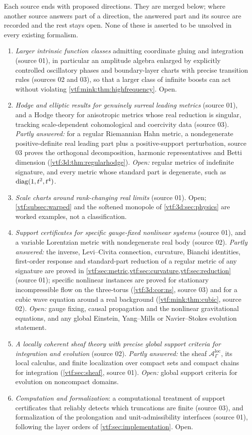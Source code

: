 \documentclass[11pt,letterpaper]{article}
\theoremstyle{definition}
\theoremstyle{remark}
\newcommand{\A}{\mathscr A}\newcommand{\OO}{\mathcal O}\newcommand{\mm}{\mathfrak m}
\begin{document}
Each source ends with proposed directions. They are merged below; where another
source answers part of a direction, the answered part and its source are
recorded and the rest stays open. None of these is asserted to be unsolved in
every existing formalism.
\begin{enumerate}
\item \emph{Larger intrinsic function classes} admitting coordinate gluing and
integration (source 01), in particular an amplitude algebra enlarged by
explicitly controlled oscillatory phases and boundary-layer charts with precise
transition rules (sources 02 and 03), so that a larger class of infinite boosts
can act without violating \cref{vtf:mink:thm:highfrequency}. Open.
\item \emph{Hodge and elliptic results for genuinely surreal leading metrics}
(source 01), and a Hodge theory for anisotropic metrics whose real reduction is
singular, tracking scale-dependent cohomological and coercivity data (source 03).
\emph{Partly answered:} for a regular Riemannian Hahn metric, a nondegenerate
positive-definite real leading part plus a positive-support perturbation, source
03 proves the orthogonal decomposition, harmonic representatives and Betti
dimension (\cref{vtf:3d:thm:regularhodge}). \emph{Open:} regular metrics of
indefinite signature, and every metric whose standard part is degenerate, such as
$\operatorname{diag}(1,t^2,t^4)$.
\item \emph{Scale charts around rank-changing real limits} (source 01). Open;
\cref{vtf:subsec:warped} and the softened monopole of \cref{vtf:3d:sec:physics}
are worked examples, not a classification.
\item \emph{Support certificates for specific gauge-fixed nonlinear systems}
(source 01), and a variable Lorentzian metric with nondegenerate real body
(source 02). \emph{Partly answered:} the inverse, Levi--Civita connection,
curvature, Bianchi identities, first-order response and standard-part reduction
of a regular metric of any signature are proved in
\cref{vtf:sec:metric,vtf:sec:curvature,vtf:sec:reduction} (source 01); specific
nonlinear instances are proved for stationary incompressible flow on the
three-torus (\cref{vtf:3d:cor:ns}, source 03) and for a cubic wave equation
around a real background (\cref{vtf:mink:thm:cubic}, source 02). \emph{Open:}
gauge fixing, causal propagation and the nonlinear gravitational equations, and
any global Einstein, Yang--Mills or Navier--Stokes evolution statement.
\item \emph{A locally coherent sheaf theory with precise global support criteria
for integration and evolution} (source 02). \emph{Partly answered:} the sheaf
$\A^{\mathrm{loc}}_\Gamma$, its local calculus, and finite localization over
compact sets and compact chains for integration (\cref{vtf:sec:sheaf},
source 01). \emph{Open:} global support criteria for evolution on noncompact
domains.
\item \emph{Computation and formalization}: a computational treatment of support
certificates that reliably detects which truncations are finite (source 03), and
formalization of the prolongation and unit-admissibility interfaces (source 01),
following the layer orders of \cref{vtf:sec:implementation}. Open.
\end{enumerate}
\end{document}
